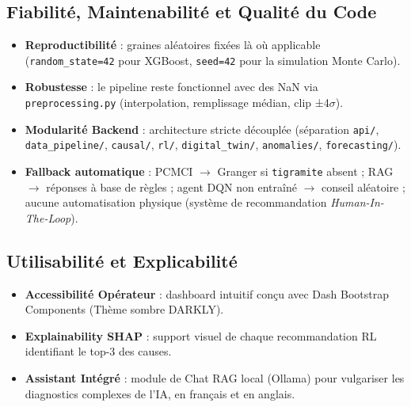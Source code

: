 \subsection{Fiabilité, Maintenabilité et Qualité du Code}
\label{subsec:bnf_fiab}

\begin{itemize}
  \item \textbf{Reproductibilité} : graines aléatoires fixées là où applicable (\texttt{random\_state=42} pour XGBoost, \texttt{seed=42} pour la simulation Monte Carlo).
  \item \textbf{Robustesse} : le pipeline reste fonctionnel avec des NaN via \texttt{preprocessing.py} (interpolation, remplissage médian, clip ±4$\sigma$).
  \item \textbf{Modularité Backend} : architecture stricte découplée (séparation \texttt{api/}, \texttt{data\_pipeline/}, \texttt{causal/}, \texttt{rl/}, \texttt{digital\_twin/}, \texttt{anomalies/}, \texttt{forecasting/}).
  \item \textbf{Fallback automatique} : PCMCI $\rightarrow$ Granger si \texttt{tigramite} absent ; RAG $\rightarrow$ réponses à base de règles ; agent DQN non entraîné $\rightarrow$ conseil aléatoire ; aucune automatisation physique (système de recommandation \textit{Human-In-The-Loop}).
\end{itemize}

\subsection{Utilisabilité et Explicabilité}
\label{subsec:bnf_ux}

\begin{itemize}
  \item \textbf{Accessibilité Opérateur} : dashboard intuitif conçu avec Dash Bootstrap Components (Thème sombre DARKLY).
  \item \textbf{Explainability SHAP} : support visuel de chaque recommandation RL identifiant le top-3 des causes.
  \item \textbf{Assistant Intégré} : module de Chat RAG local (Ollama) pour vulgariser les diagnostics complexes de l'IA, en français et en anglais.
\end{itemize}

